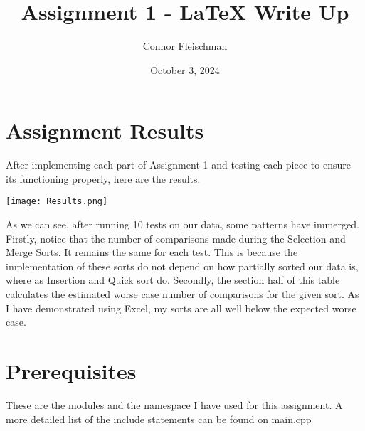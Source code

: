 \documentclass[12pt, letterpaper]{article}
\title{Assignment 1 - LaTeX Write Up}
\author{Connor Fleischman}
\date{October 3, 2024}
\begin{document}
\maketitle

\section{Assignment Results} \label{AssignmentResult}
After implementing each part of Assignment 1 and testing each piece to ensure its functioning properly, here are the results.
\begin{center}
   \texttt{[image: Results.png]}
\end{center}
As we can see, after running 10 tests on our data, some patterns have immerged. Firstly, notice that the number of comparisons made during the Selection and Merge Sorts. It remains the same for each test. This is because
the implementation of these sorts do not depend on how partially sorted our data is, where as Insertion and Quick sort do. Secondly, the section half of this table calculates the estimated worse case number of comparisons for
the given sort. As I have demonstrated using Excel, my sorts are all well below the expected worse case. 

\section{Prerequisites} \label{Prereq}
These are the modules and the namespace I have used for this assignment. A more detailed list of the include statements can be found on main.cpp


\end{document}
